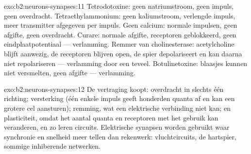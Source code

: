 \begin{solution}{exo:b2:neurons-synapses:11}
Tetrodotoxine: geen natriumstroom, geen impuls, geen overdracht.
Tetraethylammonium: geen kaliumstroom, verlengde impuls, meer transmitter
afgegeven per impuls. Geen calcium: normale impulsen, geen afgifte, geen
overdracht. Curare: normale afgifte, receptoren geblokkeerd, geen
eindplaatpotentiaal --- verlamming. Remmer van cholinesterase: acetylcholine
blijft aanwezig, de receptoren blijven open, de spier depolariseert en kan
daarna niet repolariseren --- verlamming door een teveel. Botulinetoxine:
blaasjes kunnen niet versmelten, geen afgifte --- verlamming.
\end{solution}

\begin{solution}{exo:b2:neurons-synapses:12}
De vertraging koopt: overdracht in slechts één richting; versterking (één
enkele impuls geeft honderden quanta af en kan een grotere cel aansturen);
remming, wat een elektrische verbinding niet kan; en plasticiteit, omdat het
aantal quanta en receptoren met het gebruik kan veranderen, en zo leren
circuits. Elektrische synapsen worden gebruikt waar synchronie en snelheid
meer tellen dan rekenwerk: vluchtcircuits, de hartspier, sommige inhiberende
netwerken.
\end{solution}

